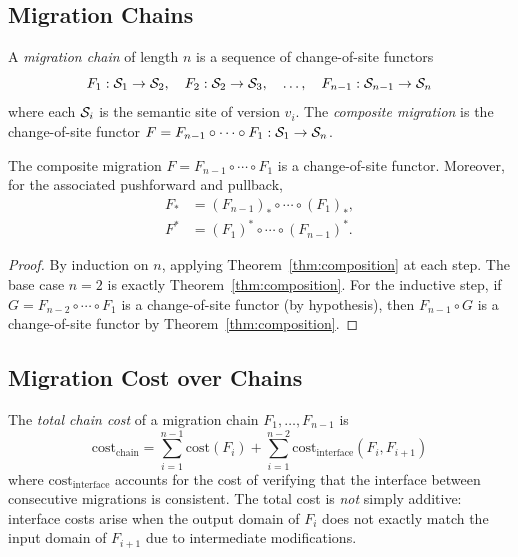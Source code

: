 \documentclass[11pt]{article}
\newcommand{\FunctorF}{F}
\newcommand{\MigCost}{\mathrm{cost}}
\begin{document}
\subsection{Migration Chains}

\begin{definition}\label{def:migration-chain}
A \emph{migration chain} of length $n$ is a sequence of change-of-site
functors
\[
  \FunctorF_1 : \Site_1 \to \Site_2, \quad
  \FunctorF_2 : \Site_2 \to \Site_3, \quad \ldots, \quad
  \FunctorF_{n-1} : \Site_{n-1} \to \Site_n
\]
where each $\mathcal{S}_i$ is the semantic site of version $v_i$.  The
\emph{composite migration} is the change-of-site functor
$\FunctorF = \FunctorF_{n-1} \circ \cdots \circ \FunctorF_1 : \Site_1
\to \Site_n$.
\end{definition}

\begin{theorem}\label{thm:chain-composition}
The composite migration $\FunctorF = \FunctorF_{n-1} \circ \cdots \circ
\FunctorF_1$ is a change-of-site functor.  Moreover, for the associated
pushforward and pullback,
\begin{align*}
  \FunctorF_* &= (\FunctorF_{n-1})_* \circ \cdots \circ (\FunctorF_1)_*, \\
  \FunctorF^* &= (\FunctorF_1)^* \circ \cdots \circ (\FunctorF_{n-1})^*.
\end{align*}
\end{theorem}

\begin{proof}
By induction on $n$, applying Theorem~\ref{thm:composition} at each step.
The base case $n=2$ is exactly Theorem~\ref{thm:composition}.  For the
inductive step, if $G = \FunctorF_{n-2} \circ \cdots \circ \FunctorF_1$ is
a change-of-site functor (by hypothesis), then $\FunctorF_{n-1} \circ G$
is a change-of-site functor by Theorem~\ref{thm:composition}.
\end{proof}

\subsection{Migration Cost over Chains}

\begin{definition}\label{def:chain-cost}
The \emph{total chain cost} of a migration chain
$\FunctorF_1, \ldots, \FunctorF_{n-1}$ is
\[
  \MigCost_{\mathrm{chain}} = \sum_{i=1}^{n-1} \MigCost(\FunctorF_i)
  + \sum_{i=1}^{n-2} \MigCost_{\mathrm{interface}}(\FunctorF_i, \FunctorF_{i+1})
\]
where $\MigCost_{\mathrm{interface}}$ accounts for the cost of verifying
that the interface between consecutive migrations is consistent.  The total
cost is \emph{not} simply additive: interface costs arise when the output
domain of $\FunctorF_i$ does not exactly match the input domain of
$\FunctorF_{i+1}$ due to intermediate modifications.
\end{definition}
\end{document}
